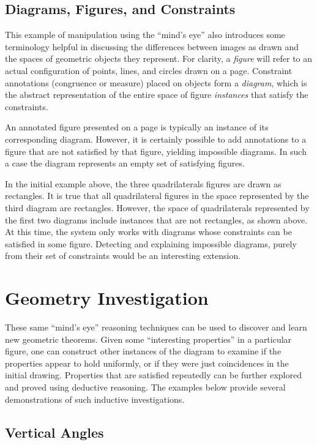 \subsection{Diagrams, Figures, and Constraints}

This example of manipulation using the ``mind's eye'' also introduces
some terminology helpful in discussing the differences between images
as drawn and the spaces of geometric objects they represent.  For
clarity, a \emph{figure} will refer to an actual configuration of
points, lines, and circles drawn on a page.  Constraint annotations
(congruence or measure) placed on objects form a \emph{diagram},
which is the abstract representation of the entire space of figure
\emph{instances} that satisfy the constraints.

An annotated figure presented on a page is typically an instance of
its corresponding diagram.  However, it is certainly possible to add
annotations to a figure that are not satisfied by that figure,
yielding impossible diagrams.  In such a case the diagram represents
an empty set of satisfying figures.

In the initial example above, the three quadrilaterals figures are
drawn as rectangles.  It is true that all quadrilateral figures in the
space represented by the third diagram are rectangles.  However, the
space of quadrilaterals represented by the first two diagrams include
instances that are not rectangles, as shown above.  At this time, the
system only works with diagrams whose constraints can be satisfied in
some figure.  Detecting and explaining impossible diagrams, purely
from their set of constraints would be an interesting extension.

\newpage
\section{Geometry Investigation}

These same ``mind's eye'' reasoning techniques can be used to discover
and learn new geometric theorems.  Given some ``interesting
properties'' in a particular figure, one can construct other instances
of the diagram to examine if the properties appear to hold uniformly,
or if they were just coincidences in the initial drawing.  Properties
that are satisfied repeatedly can be further explored and proved using
deductive reasoning.  The examples below provide several
demonstrations of such inductive investigations.

\subsection{Vertical Angles}

